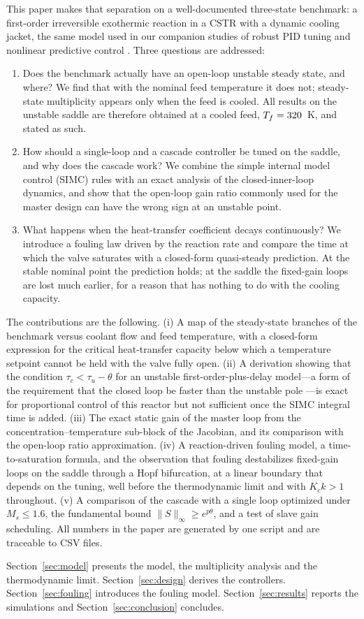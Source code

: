 This paper makes that separation on a well-documented three-state benchmark: a first-order irreversible exothermic reaction in a CSTR with a dynamic cooling jacket, the same model used in our companion studies of robust PID tuning \cite{andrade2026robust} and nonlinear predictive control \cite{andrade2026when}. Three questions are addressed:
\begin{enumerate}
    \item Does the benchmark actually have an open-loop unstable steady state, and where? We find that with the nominal feed temperature it does not; steady-state multiplicity appears only when the feed is cooled. All results on the unstable saddle are therefore obtained at a cooled feed, $T_f=320$~K, and stated as such.
    \item How should a single-loop and a cascade controller be tuned on the saddle, and why does the cascade work? We combine the simple internal model control (SIMC) rules \cite{skogestad2003simple,grimholt2018optimal} with an exact analysis of the closed-inner-loop dynamics, and show that the open-loop gain ratio commonly used for the master design can have the wrong sign at an unstable point.
    \item What happens when the heat-transfer coefficient decays continuously? We introduce a fouling law driven by the reaction rate and compare the time at which the valve saturates with a closed-form quasi-steady prediction. At the stable nominal point the prediction holds; at the saddle the fixed-gain loops are lost much earlier, for a reason that has nothing to do with the cooling capacity.
\end{enumerate}

The contributions are the following. (i) A map of the steady-state branches of the benchmark versus coolant flow and feed temperature, with a closed-form expression for the critical heat-transfer capacity below which a temperature setpoint cannot be held with the valve fully open. (ii) A derivation showing that the condition $\tau_c<\tau_u-\theta$ for an unstable first-order-plus-delay model---a form of the requirement that the closed loop be faster than the unstable pole \cite{stein2003respect,skogestad2005multivariable}---is exact for proportional control of this reactor but not sufficient once the SIMC integral time is added. (iii) The exact static gain of the master loop from the concentration--temperature sub-block of the Jacobian, and its comparison with the open-loop ratio approximation. (iv) A reaction-driven fouling model, a time-to-saturation formula, and the observation that fouling destabilizes fixed-gain loops on the saddle through a Hopf bifurcation, at a linear boundary that depends on the tuning, well before the thermodynamic limit and with $K_ck>1$ throughout. (v) A comparison of the cascade with a single loop optimized under $M_s\le1.6$, the fundamental bound $\|S\|_\infty\ge e^{p\theta}$, and a test of slave gain scheduling. All numbers in the paper are generated by one script and are traceable to CSV files.

Section~\ref{sec:model} presents the model, the multiplicity analysis and the thermodynamic limit. Section~\ref{sec:design} derives the controllers. Section~\ref{sec:fouling} introduces the fouling model. Section~\ref{sec:results} reports the simulations and Section~\ref{sec:conclusion} concludes.
